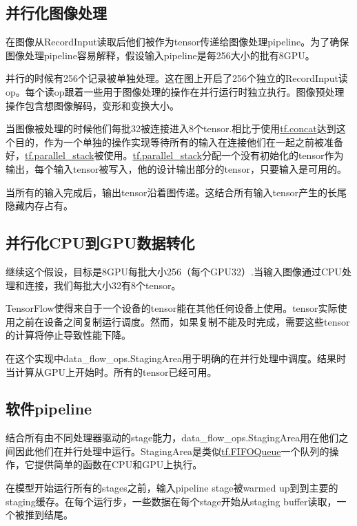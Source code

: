 \subsection{并行化图像处理}
在图像从RecordInput读取后他们被作为tensor传递给图像处理pipeline。为了确保图像处理pipeline容易解释，假设输入pipeline是每256大小的批有8GPU。

并行的时候有256个记录被单独处理。这在图上开启了256个独立的RecordInput读op。每个读op跟着一些用于图像处理的操作在并行运行时独立执行。图像预处理操作包含想图像解码，变形和变换大小。

当图像被处理的时候他们每批32被连接进入8个tensor.相比于使用\href{https://www.tensorflow.org/api_docs/python/tf/concat}{tf.concat}达到这个目的，作为一个单独的操作实现等待所有的输入在连接他们在一起之前被准备好，\href{https://www.tensorflow.org/api_docs/python/tf/parallel_stack}{tf.parallel\_stack}被使用。\href{https://www.tensorflow.org/api_docs/python/tf/parallel_stack}{tf.parallel\_stack}分配一个没有初始化的tensor作为输出，每个输入tensor被写入，他的设计输出部分的tensor，只要输入是可用的。

当所有的输入完成后，输出tensor沿着图传递。这结合所有输入tensor产生的长尾隐藏内存占有。

\subsection{并行化CPU到GPU数据转化}
继续这个假设，目标是8GPU每批大小256（每个GPU32）.当输入图像通过CPU处理和连接，我们每批大小32有8个tensor。

TensorFlow使得来自于一个设备的tensor能在其他任何设备上使用。tensor实际使用之前在设备之间复制运行调度。然而，如果复制不能及时完成，需要这些tensor的计算将停止导致性能下降。

在这个实现中data\_flow\_ops.StagingArea用于明确的在并行处理中调度。结果时当计算从GPU上开始时。所有的tensor已经可用。

\subsection{软件pipeline}
结合所有由不同处理器驱动的stage能力，data\_flow\_ops.StagingArea用在他们之间因此他们在并行处理中运行。StagingArea是类似\href{https://www.tensorflow.org/api_docs/python/tf/FIFOQueue}{tf.FIFOQueue}一个队列的操作，它提供简单的函数在CPU和GPU上执行。

在模型开始运行所有的stages之前，输入pipeline stage被warmed up到到主要的staging缓存。在每个运行步，一些数据在每个stage开始从staging buffer读取，一个被推到结尾。

